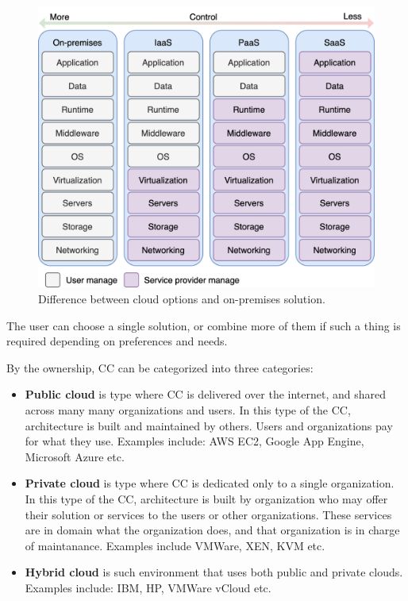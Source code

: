 \begin{figure}[H]
	\begin{center}
		\includegraphics[scale=0.9]{images/Figure1.png}
	\end{center}
	\vspace{-0.6cm}
	\caption{Difference between cloud options and on-premises solution.}
	\label{fig:fig1}
\end{figure}

The user can choose a single solution, or combine more of them if such a thing is required depending on preferences and needs.

By the ownership, CC can be categorized into three categories:

\begin{itemize}
	\item \textbf{Public cloud} is type where CC is delivered over the internet, and shared across many many organizations and users. In this type of the CC, architecture is built and maintained by others. Users and organizations pay for what they use. Examples include: AWS EC2, Google App Engine, Microsoft Azure etc.
	\item \textbf{Private cloud} is type where CC is dedicated only to a single organization. In this type of the CC, architecture is built by organization who may offer their solution or services to the users or other organizations. These services are in domain what the organization does, and that organization is in charge of maintanance. Examples include VMWare, XEN, KVM etc.
	\item \textbf{Hybrid cloud} is such environment that uses both public and private clouds. Examples include: IBM, HP, VMWare vCloud etc.
\end{itemize}

